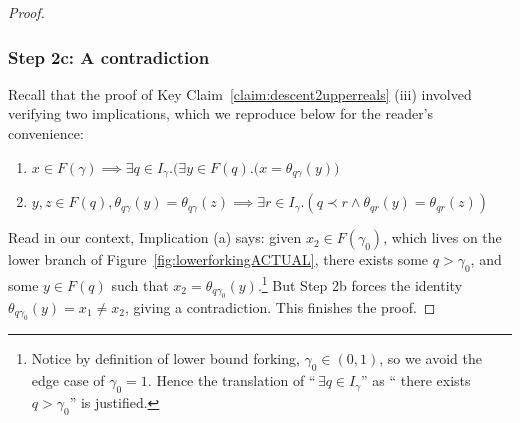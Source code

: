 \documentclass[a4paper, 11pt,reqno]{amsart}
\newcommand{\D}{\mathcal{D}}
\begin{document}
\begin{proof}
	\subsubsection*{Step 2c: A contradiction} Recall that the proof of Key Claim~\ref{claim:descent2upperreals} (iii) involved verifying two implications, which we reproduce below for the reader's convenience:
	\begin{enumerate}[label=(\alph*)]
		\item $x\in F(\gamma )\implies\exists q\in I_\gamma  .\big(\exists y\in F(q).(x=\theta_{q\gamma }(y)\big)$
		\item $y,z\in F(q),\theta_{q\gamma}(y)=\theta_{q\gamma}(z)\implies \exists r\in I_\gamma. (q\prec r \land \theta_{qr}(y)=\theta_{qr}(z))$
	\end{enumerate}
	Read in our context, Implication (a) says: given $x_2\in F(\gamma_0)$, which lives on the lower branch of Figure~\ref{fig:lowerforkingACTUAL},  there exists some $q>\gamma_0$, and some $y\in F(q)$ such that $x_2=\theta_{q\gamma_0}(y)$.\footnote{Notice by definition of lower bound forking, $\gamma_0\in(0,1)$, so we avoid the edge case of $\gamma_0=1$. Hence the translation of ``$\,\exists q\in I_{\gamma}$'' as `` there exists $q>\gamma_0$'' is justified.} But Step 2b forces the identity  $\theta_{q\gamma_0}(y)=x_1\neq x_2$, giving a contradiction. This finishes the proof.
	

\end{proof}
\end{document}
